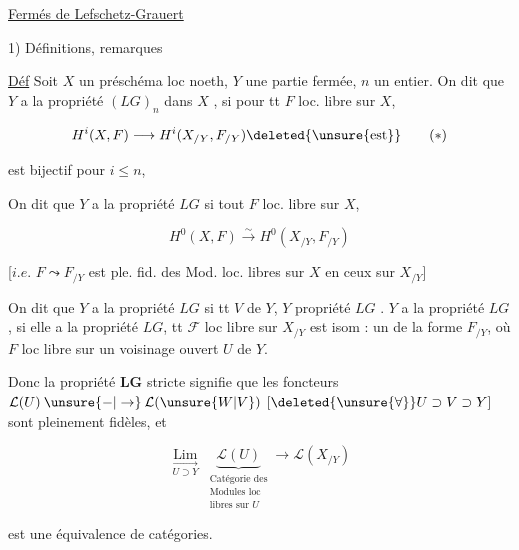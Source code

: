 
\uline{Fermés de Lefschetz-Grauert}

1) Définitions, remarques

\uline{Déf} Soit $X$ un préschéma loc noeth, $Y$ une partie fermée, $n$ un entier. On dit que $Y$ a la propriété $(LG)_n$ dans $X$ , si pour tt $F$ loc. libre sur $X$,

\[
H^i(X,F)\longrightarrow H^i(X_{/Y},F_{/Y})\deleted{\unsure{\mathrm{est}}}
\tag*{($\ast$)}
\]

est bijectif pour $i\leq n$, 

On dit que $Y$ a la propriété $LG$  si   tout $F$ loc. libre sur $X$,

\[
H^0(X,F)\overset{\sim}{\longrightarrow}H^0(X_{/Y},F_{/Y})
\]

[$i.e.$ $F\leadsto F_{/Y}$ est ple. fid. des Mod. loc. libres sur $X$ en ceux sur $X_{/Y}$]

On dit que $Y$ a la propriété $LG$  si tt $V$  de $Y$, $Y$   propriété $LG$ . \uline{} $Y$ a la propriété $LG$,   si elle a la propriété $LG$,  
tt $\mathcal F$ loc libre sur $X_{/Y}$  est isom : un  de la forme $F_{/Y}$, où $F$ loc libre sur un voisinage ouvert $U$ de $Y$.

Donc la propriété \textbf{LG} stricte signifie que les foncteurs $\mathcal L(U)\mathbin{\unsure{-|\to}}\mathcal L(\unsure{W|V})$ $[\deleted{\unsure{\forall}}U\supset V\supset Y]$ sont pleinement fidèles, et

\[
\underset{U\supset Y}{\underset{\longrightarrow}{\operatorname{Lim}}}\;
\underbrace{\mathcal L(U)}_{\substack{\text{Catégorie des}\\\text{Modules loc}\\\text{libres sur }U}}
\longrightarrow\mathcal L(X_{/Y})
\]

est une équivalence de catégories.

